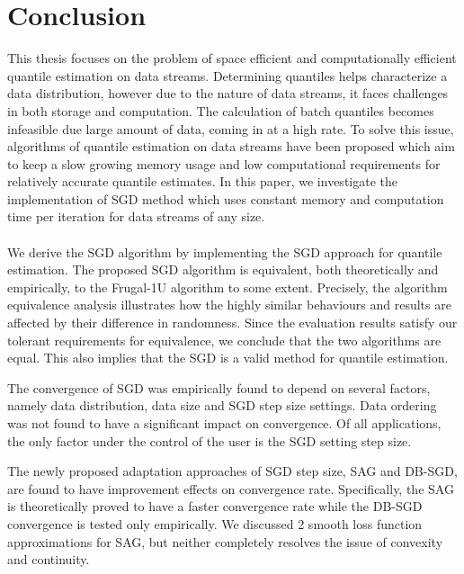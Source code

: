 \chapter{Conclusion}
\label{ch: conclusion}


This thesis focuses on the problem of space efficient and computationally efficient quantile estimation on data streams.
Determining quantiles helps characterize a data distribution, however due to the nature of data streams, it faces challenges in both storage and computation. The calculation of batch quantiles becomes infeasible due large amount of data, coming in at a high rate.
To solve this issue, algorithms of quantile estimation on data streams have been proposed which aim to keep a slow growing memory usage and low computational requirements for relatively accurate quantile estimates.
In this paper, we investigate the implementation of SGD method which uses constant memory and computation time per iteration for data streams of any size.
\\\\
We derive the SGD algorithm by implementing the SGD approach for quantile estimation. The proposed SGD algorithm is equivalent, both theoretically and empirically, to the Frugal-1U algorithm to some extent. Precisely, the algorithm equivalence analysis illustrates how the highly similar behaviours and results are affected by their difference in randomness. Since the evaluation results satisfy our tolerant requirements for equivalence, we conclude that the two algorithms are equal. This also implies that the SGD is a valid method for quantile estimation.

The convergence of SGD was empirically found to depend on several factors,
namely data distribution, data size and SGD step size settings. Data ordering was not found to have a significant impact on convergence. Of all applications, the only factor under the control of the user is the SGD setting step size. 

The newly proposed adaptation approaches of SGD step size, SAG and DB-SGD, are found to have improvement effects on convergence rate. Specifically, the SAG is theoretically proved to have a faster convergence rate while the DB-SGD convergence is tested only empirically. 
We discussed 2 smooth loss function approximations for SAG, but neither completely resolves the issue of convexity and continuity.

